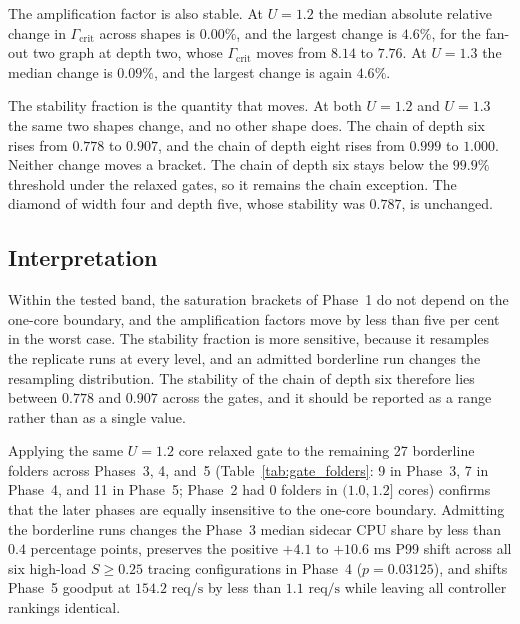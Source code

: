 

The amplification factor is also stable. At $U=1.2$ the median absolute relative change in $\Gamma_{\mathrm{crit}}$ across shapes is $0.00\%$, and the largest change is $4.6\%$, for the fan-out two graph at depth two, whose $\Gamma_{\mathrm{crit}}$ moves from $8.14$ to $7.76$. At $U=1.3$ the median change is $0.09\%$, and the largest change is again $4.6\%$.

The stability fraction is the quantity that moves. At both $U=1.2$ and $U=1.3$ the same two shapes change, and no other shape does. The chain of depth six rises from $0.778$ to $0.907$, and the chain of depth eight rises from $0.999$ to $1.000$. Neither change moves a bracket. The chain of depth six stays below the $99.9\%$ threshold under the relaxed gates, so it remains the chain exception. The diamond of width four and depth five, whose stability was $0.787$, is unchanged.

\subsection{Interpretation}
\label{sec:gate_interp}

Within the tested band, the saturation brackets of Phase~1 do not depend on the one-core boundary, and the amplification factors move by less than five per cent in the worst case. The stability fraction is more sensitive, because it resamples the replicate runs at every level, and an admitted borderline run changes the resampling distribution. The stability of the chain of depth six therefore lies between $0.778$ and $0.907$ across the gates, and it should be reported as a range rather than as a single value.

Applying the same $U = 1.2\text{ core}$ relaxed gate to the remaining 27 borderline folders across Phases~3, 4, and~5 (Table~\ref{tab:gate_folders}: 9 in Phase~3, 7 in Phase~4, and 11 in Phase~5; Phase~2 had 0 folders in $(1.0, 1.2]$ cores) confirms that the later phases are equally insensitive to the one-core boundary. Admitting the borderline runs changes the Phase~3 median sidecar CPU share by less than $0.4$ percentage points, preserves the positive $+4.1$ to $+10.6\text{ ms}$ P99 shift across all six high-load $S \ge 0.25$ tracing configurations in Phase~4 ($p = 0.03125$), and shifts Phase~5 goodput at $154.2\text{ req/s}$ by less than $1.1\text{ req/s}$ while leaving all controller rankings identical.

